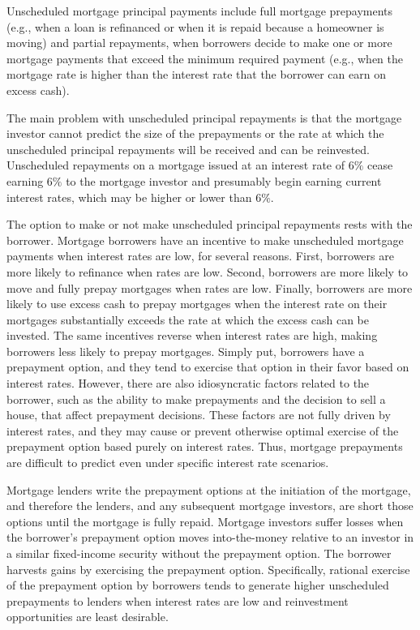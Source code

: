 \documentclass[11pt]{article}
\begin{document}
Unscheduled mortgage principal payments include full mortgage prepayments (e.g., when a loan is refinanced or when it is repaid because a homeowner is moving) and partial repayments, when borrowers decide to make one or more mortgage payments that exceed the minimum required payment (e.g., when the mortgage rate is higher than the interest rate that the borrower can earn on excess cash).

The main problem with unscheduled principal repayments is that the mortgage investor cannot predict the size of the prepayments or the rate at which the unscheduled principal repayments will be received and can be reinvested. Unscheduled repayments on a mortgage issued at an interest rate of $6 \%$ cease earning $6 \%$ to the mortgage investor and presumably begin earning current interest rates, which may be higher or lower than $6 \%$.

The option to make or not make unscheduled principal repayments rests with the borrower. Mortgage borrowers have an incentive to make unscheduled mortgage payments when interest rates are low, for several reasons. First, borrowers are more likely to refinance when rates are low. Second, borrowers are more likely to move and fully prepay mortgages when rates are low. Finally, borrowers are more likely to use excess cash to prepay mortgages when the interest rate on their mortgages substantially exceeds the rate at which the excess cash can be invested. The same incentives reverse when interest rates are high, making borrowers less likely to prepay mortgages. Simply put, borrowers have a prepayment option, and they tend to exercise that option in their favor based on interest rates. However, there are also idiosyncratic factors related to the borrower, such as the ability to make prepayments and the decision to sell a house, that affect prepayment decisions. These factors are not fully driven by interest rates, and they may cause or prevent otherwise optimal exercise of the prepayment option based purely on interest rates. Thus, mortgage prepayments are difficult to predict even under specific interest rate scenarios.

Mortgage lenders write the prepayment options at the initiation of the mortgage, and therefore the lenders, and any subsequent mortgage investors, are short those options until the mortgage is fully repaid. Mortgage investors suffer losses when the borrower's prepayment option moves into-the-money relative to an investor in a similar fixed-income security without the prepayment option. The borrower harvests gains by exercising the prepayment option. Specifically, rational exercise of the prepayment option by borrowers tends to generate higher unscheduled prepayments to lenders when interest rates are low and reinvestment opportunities are least desirable.
\end{document}
